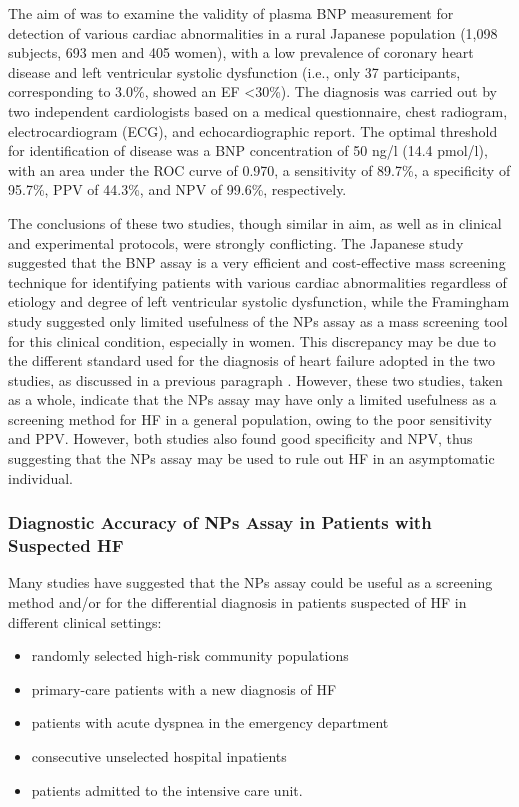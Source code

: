 \documentclass[14pt,a4paper,onecolumn]{extarticle}
\begin{document}
The aim of \citep{bib366} was to examine the validity of plasma BNP measurement for detection of various cardiac abnormalities in a rural Japanese population (1,098 subjects, 693 men and 405 women), with a low prevalence of coronary heart disease and left ventricular systolic dysfunction (i.e., only 37 participants, corresponding to 3.0\%, showed an EF <30\%). The diagnosis was carried out by two independent cardiologists based on a medical questionnaire, chest radiogram, electrocardiogram (ECG), and echocardiographic report. The optimal threshold for identification of disease was a BNP concentration of 50 ng/l (14.4 pmol/l), with an area under the ROC curve of 0.970, a sensitivity of 89.7\%, a specificity of 95.7\%, PPV of 44.3\%, and NPV of 99.6\%, respectively.

The conclusions of these two studies, though similar in aim, as well as in clinical and experimental protocols, were strongly conflicting. The Japanese study suggested that the BNP assay is a very efficient and cost-effective mass screening technique for identifying patients with various cardiac abnormalities regardless of etiology and degree of left ventricular systolic dysfunction, while the Framingham study suggested only limited usefulness of the NPs assay as a mass screening tool for this clinical condition, especially in women.  This discrepancy may be due to the different standard used for the diagnosis of heart failure adopted in the two studies, as discussed in a previous paragraph . However, these two studies, taken as a whole, indicate that the NPs assay may have only a limited usefulness as a screening method for HF in a general population, owing to the poor sensitivity and PPV. However, both studies also found good specificity and NPV, thus suggesting that the NPs assay may be used to rule out HF in an asymptomatic individual.

\subsubsection{ Diagnostic Accuracy of NPs Assay in Patients with Suspected HF}

Many studies have suggested that the NPs assay could be useful as a screening method and/or for the differential diagnosis in patients suspected of HF in different clinical settings:

\begin{itemize}

  \item randomly selected high-risk community populations

  \item primary-care patients with a new diagnosis of HF

  \item patients with acute dyspnea in the emergency department

  \item consecutive unselected hospital inpatients

  \item patients admitted to the intensive care unit.

\end{itemize}
\end{document}
